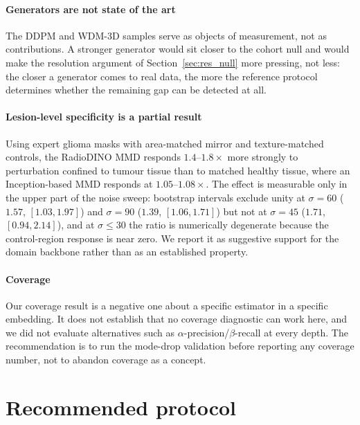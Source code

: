 \paragraph{Generators are not state of the art}
The DDPM and WDM-3D samples serve as objects of measurement, not as
contributions. A stronger generator would sit closer to the cohort null and
would make the resolution argument of Section~\ref{sec:res_null} more pressing,
not less: the closer a generator comes to real data, the more the reference
protocol determines whether the remaining gap can be detected at all.

\paragraph{Lesion-level specificity is a partial result}
Using expert glioma masks with area-matched mirror and texture-matched
controls, the RadioDINO MMD responds $1.4$--$1.8\times$ more strongly to
perturbation confined to tumour tissue than to matched healthy tissue, where an
Inception-based MMD responds at $1.05$--$1.08\times$. The effect is measurable
only in the upper part of the noise sweep: bootstrap intervals exclude unity at
$\sigma = 60$ ($1.57$, $[1.03, 1.97]$) and $\sigma = 90$ ($1.39$,
$[1.06, 1.71]$) but not at $\sigma = 45$ ($1.71$, $[0.94, 2.14]$), and at
$\sigma \le 30$ the ratio is numerically degenerate because the control-region
response is near zero. We report it as suggestive support for the domain
backbone rather than as an established property.

\paragraph{Coverage}
Our coverage result is a negative one about a specific estimator in a specific
embedding. It does not establish that no coverage diagnostic can work here, and
we did not evaluate alternatives such as $\alpha$-precision/$\beta$-recall
\citep{alaa2022faithful} at every depth. The recommendation is to run the
mode-drop validation before reporting any coverage number, not to abandon
coverage as a concept.

\section{Recommended protocol}
\label{sec:protocol}

